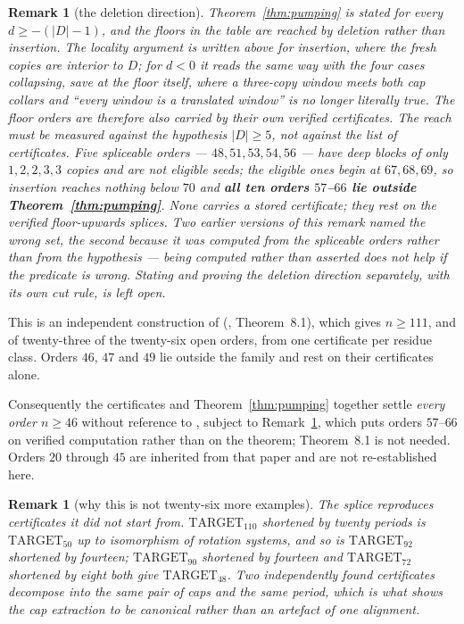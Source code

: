 \documentclass{baustms}
\theoremstyle{cupthm}
\theoremstyle{cupdefn}
\theoremstyle{cuprem}
\newtheorem{remark}[theorem]{Remark}
\begin{document}
\begin{remark}[the deletion direction]\label{rem:deletion}
Theorem~\ref{thm:pumping} is stated for every $d \ge -(|D|-1)$, and the floors
in the table are reached by deletion rather than insertion. The locality
argument is written above for insertion, where the fresh copies are interior to
$D$; for $d < 0$ it reads the same way with the four cases collapsing, save at
the floor itself, where a three-copy window meets both cap collars and ``every
window is a translated window'' is no longer literally true. The floor orders are therefore also carried by their own
verified certificates. The reach must be measured against the hypothesis
$|D| \ge 5$, not against the list of certificates. Five spliceable orders ---
$48, 51, 53, 54, 56$ --- have deep blocks of only $1,2,2,3,3$ copies and are not
eligible seeds; the eligible ones begin at $67, 68, 69$, so insertion reaches
nothing below $70$ and \textbf{all ten orders $57$--$66$ lie outside
Theorem~\ref{thm:pumping}}. None carries a stored certificate; they rest on the
verified floor-upwards splices. Two earlier versions of this remark named the
wrong set, the second because it was computed from the spliceable orders rather
than from the hypothesis --- being computed rather than asserted does not help
if the predicate is wrong. Stating and proving the deletion direction
separately, with its own cut rule, is left open.
\end{remark}

This is an independent construction of (\cite{AHSSV2015}, Theorem~8.1), which
gives $n \ge 111$, and of twenty-three of the twenty-six open orders, from one
certificate per residue class. Orders $46$, $47$ and $49$ lie outside the family
and rest on their certificates alone.

Consequently the certificates and Theorem~\ref{thm:pumping} together settle
\emph{every order $n \ge 46$} without reference to \cite{AHSSV2015}, subject to
Remark~\ref{rem:deletion}, which puts orders $57$--$66$ on verified computation
rather than on the theorem; Theorem~8.1 is not needed. Orders $20$ through $45$ are inherited from that paper and are not
re-established here.

\begin{remark}[why this is not twenty-six more examples]
The splice reproduces certificates it did not start from.
$\mathrm{TARGET}_{110}$ shortened by twenty periods is $\mathrm{TARGET}_{50}$ up
to isomorphism of rotation systems, and so is $\mathrm{TARGET}_{92}$ shortened
by fourteen; $\mathrm{TARGET}_{90}$ shortened by fourteen and
$\mathrm{TARGET}_{72}$ shortened by eight both give $\mathrm{TARGET}_{48}$. Two
independently found certificates decompose into the same pair of caps and the
same period, which is what shows the cap extraction to be canonical rather than
an artefact of one alignment.
\end{remark}
\end{document}
